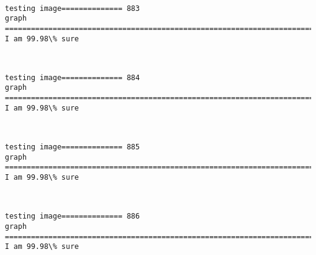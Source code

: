 \documentclass[11pt]{article}
\begin{document}
    \begin{center}
    \end{center}
    { \hspace*{\fill} \\}
    
    \begin{Verbatim}[commandchars=\\\{\}]
testing image============== 883
graph
============================================================================
I am 99.98\% sure

    \end{Verbatim}

    \begin{center}
    \end{center}
    { \hspace*{\fill} \\}
    
    \begin{Verbatim}[commandchars=\\\{\}]
testing image============== 884
graph
============================================================================
I am 99.98\% sure

    \end{Verbatim}

    \begin{center}
    \end{center}
    { \hspace*{\fill} \\}
    
    \begin{Verbatim}[commandchars=\\\{\}]
testing image============== 885
graph
============================================================================
I am 99.98\% sure

    \end{Verbatim}

    \begin{center}
    \end{center}
    { \hspace*{\fill} \\}
    
    \begin{Verbatim}[commandchars=\\\{\}]
testing image============== 886
graph
============================================================================
I am 99.98\% sure

    \end{Verbatim}
\end{document}

